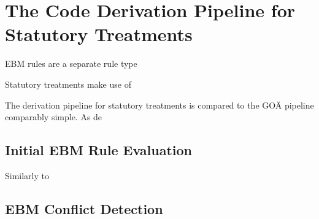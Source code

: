 \section{The Code Derivation Pipeline for Statutory Treatments}\label{sec:the-code-derivation-pipeline-for-statutory-treatments}

EBM rules are a separate rule type

Statutory treatments make use of

The derivation pipeline for statutory treatments is compared to the GOÄ pipeline comparably simple.
As de



\subsection{Initial EBM Rule Evaluation}\label{subsec:initial-ebm-rule-evaluation}
Similarly to

\subsection{EBM Conflict Detection}\label{subsec:ebm-conflict-detection}

